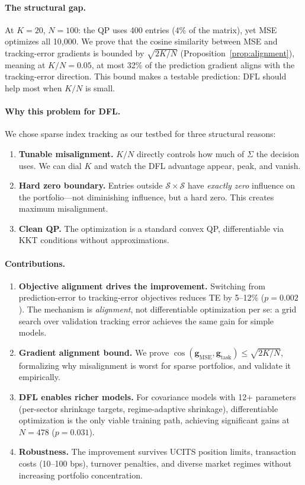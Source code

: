 \documentclass[11pt]{article}
\newcommand{\cS}{\mathcal{S}}
\begin{document}
\paragraph{The structural gap.}
At $K=20$, $N=100$: the QP uses 400 entries (4\% of the matrix), yet MSE optimizes all 10{,}000. We prove that the cosine similarity between MSE and tracking-error gradients is bounded by $\sqrt{2K/N}$ (Proposition~\ref{prop:alignment}), meaning at $K/N = 0.05$, at most 32\% of the prediction gradient aligns with the tracking-error direction. This bound makes a testable prediction: DFL should help most when $K/N$ is small.

\paragraph{Why this problem for DFL.}
We chose sparse index tracking as our testbed for three structural reasons:
\begin{enumerate}[nosep]
  \item \textbf{Tunable misalignment.} $K/N$ directly controls how much of $\Sigma$ the decision uses. We can dial $K$ and watch the DFL advantage appear, peak, and vanish.
  \item \textbf{Hard zero boundary.} Entries outside $\cS \times \cS$ have \emph{exactly zero} influence on the portfolio---not diminishing influence, but a hard zero. This creates maximum misalignment.
  \item \textbf{Clean QP.} The optimization is a standard convex QP, differentiable via KKT conditions without approximations.
\end{enumerate}

\paragraph{Contributions.}
\begin{enumerate}[nosep]
  \item \textbf{Objective alignment drives the improvement.} Switching from prediction-error to tracking-error objectives reduces TE by 5--12\% ($p = 0.002$). The mechanism is \emph{alignment}, not differentiable optimization per se: a grid search over validation tracking error achieves the same gain for simple models.
  \item \textbf{Gradient alignment bound.} We prove $\cos(\mathbf{g}_{\text{MSE}}, \mathbf{g}_{\text{task}}) \leq \sqrt{2K/N}$, formalizing why misalignment is worst for sparse portfolios, and validate it empirically.
  \item \textbf{DFL enables richer models.} For covariance models with 12+ parameters (per-sector shrinkage targets, regime-adaptive shrinkage), differentiable optimization is the only viable training path, achieving significant gains at $N{=}478$ ($p = 0.031$).
  \item \textbf{Robustness.} The improvement survives UCITS position limits, transaction costs (10--100 bps), turnover penalties, and diverse market regimes without increasing portfolio concentration.
\end{enumerate}
\end{document}
